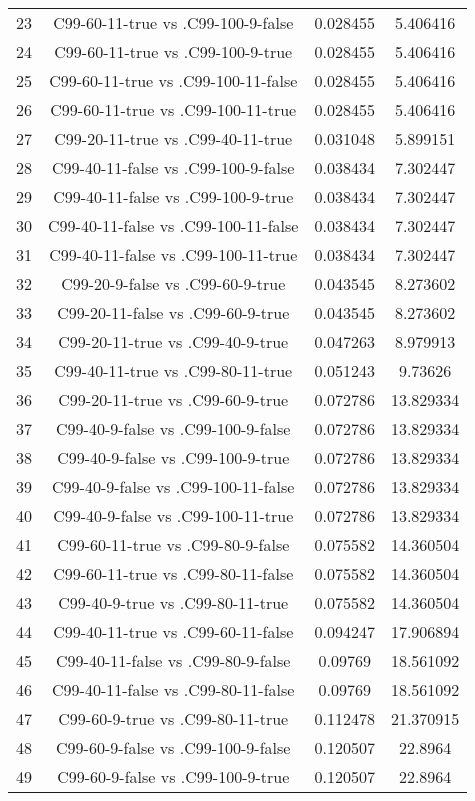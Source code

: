 \documentclass[a4paper,10pt]{article}
\begin{document}
\begin{landscape}
\begin{table}[!htp]
\begin{tabular}{cccc}
23&C99-60-11-true vs .C99-100-9-false&0.028455&5.406416\\
24&C99-60-11-true vs .C99-100-9-true&0.028455&5.406416\\
25&C99-60-11-true vs .C99-100-11-false&0.028455&5.406416\\
26&C99-60-11-true vs .C99-100-11-true&0.028455&5.406416\\
27&C99-20-11-true vs .C99-40-11-true&0.031048&5.899151\\
28&C99-40-11-false vs .C99-100-9-false&0.038434&7.302447\\
29&C99-40-11-false vs .C99-100-9-true&0.038434&7.302447\\
30&C99-40-11-false vs .C99-100-11-false&0.038434&7.302447\\
31&C99-40-11-false vs .C99-100-11-true&0.038434&7.302447\\
32&C99-20-9-false vs .C99-60-9-true&0.043545&8.273602\\
33&C99-20-11-false vs .C99-60-9-true&0.043545&8.273602\\
34&C99-20-11-true vs .C99-40-9-true&0.047263&8.979913\\
35&C99-40-11-true vs .C99-80-11-true&0.051243&9.73626\\
36&C99-20-11-true vs .C99-60-9-true&0.072786&13.829334\\
37&C99-40-9-false vs .C99-100-9-false&0.072786&13.829334\\
38&C99-40-9-false vs .C99-100-9-true&0.072786&13.829334\\
39&C99-40-9-false vs .C99-100-11-false&0.072786&13.829334\\
40&C99-40-9-false vs .C99-100-11-true&0.072786&13.829334\\
41&C99-60-11-true vs .C99-80-9-false&0.075582&14.360504\\
42&C99-60-11-true vs .C99-80-11-false&0.075582&14.360504\\
43&C99-40-9-true vs .C99-80-11-true&0.075582&14.360504\\
44&C99-40-11-true vs .C99-60-11-false&0.094247&17.906894\\
45&C99-40-11-false vs .C99-80-9-false&0.09769&18.561092\\
46&C99-40-11-false vs .C99-80-11-false&0.09769&18.561092\\
47&C99-60-9-true vs .C99-80-11-true&0.112478&21.370915\\
48&C99-60-9-false vs .C99-100-9-false&0.120507&22.8964\\
49&C99-60-9-false vs .C99-100-9-true&0.120507&22.8964\\

\end{tabular}
\end{table}
\end{landscape}
\end{document}
